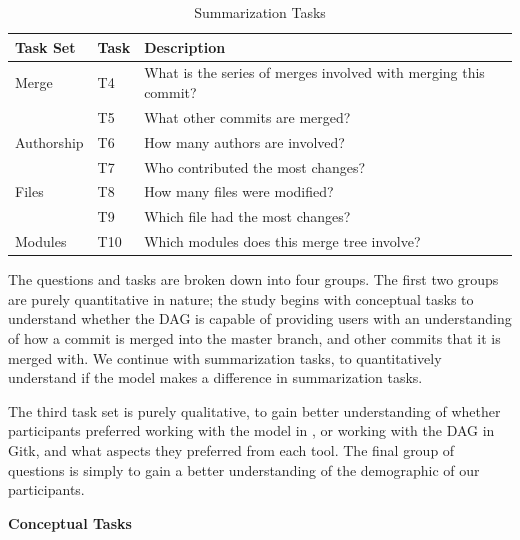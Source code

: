 \begin{table}[htpb]
  \centering
  \caption{Summarization Tasks}
  \label{tab:summarization_tasks}
  \begin{tabulary}{\linewidth}{LLL}
    \toprule
    Task Set   & Task & Description\\\midrule
    Merge      & T4   & What is the series of merges involved with merging this
    commit?\\
               & T5   & What other commits are merged?\\
    Authorship & T6   & How many authors are involved?\\
               & T7   & Who contributed the most changes?\\
    Files      & T8   & How many files were modified?\\
               & T9   & Which file had the most changes?\\
    Modules    & T10  & Which modules does this merge tree involve?\\
    \bottomrule
  \end{tabulary}
\end{table}



The questions and tasks are broken down into four groups. The first two
groups are purely quantitative in nature; the study begins with
conceptual tasks to understand whether the DAG is capable of providing
users with an understanding of how a commit is merged into the master
branch, and other commits that it is merged with. We continue with
summarization tasks, to quantitatively understand if the \mt model makes
a difference in summarization tasks.

The third task set is purely qualitative,  to gain better understanding
of whether participants preferred working with the \mt model in \tool,
or working with the DAG in Gitk, and what aspects they preferred from
each tool. The final group of questions is simply to gain a better
understanding of the demographic of our participants.


\textbf{Conceptual Tasks}



